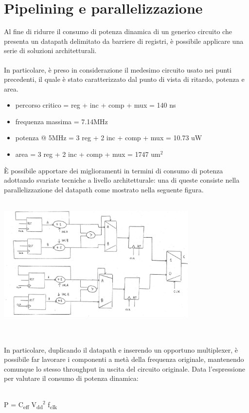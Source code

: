 \documentclass[11pt,  english, makeidx, a4paper, titlepage, oneside]{book}
\begin{document}
\section{Pipelining e parallelizzazione}
Al fine di ridurre il consumo di potenza dinamica di un generico circuito che presenta un datapath delimitato da barriere di registri, è possibile applicare una serie di soluzioni architetturali.
\\\\
In particolare, è preso in considerazione il medesimo circuito usato nei punti precedenti, il quale è stato caratterizzato dal punto di vista di ritardo, potenza e area.
\begin{itemize}
\item percorso critico = reg + inc + comp + mux = 140 ns
\item frequenza massima = 7.14MHz
\item potenza @ 5MHz = 3 reg + 2 inc + comp + mux = 10.73 uW
\item area = 3 reg + 2 inc + comp + mux = 1747 um$^2$
\end{itemize}
\vspace{0.3cm}
È possibile apportare dei miglioramenti in termini di consumo di potenza adottando svariate tecniche a livello architetturale: una di queste consiste nella parallelizzazione del datapath come mostrato nella seguente figura.
\\\\
\centerline{\includegraphics[width=10cm]{./img/Lab_3/datapath_parallelo.jpg}}
\\\\
In particolare, duplicando il datapath e inserendo un opportuno multiplexer, è possibile far lavorare i componenti a metà della frequenza originale, mantenendo comunque lo stesso throughput in uscita del circuito originale. Data l'espressione per valutare il consumo di potenza dinamica:
\\\\
\centerline{P = C\textsubscript{eff} V\textsubscript{dd}$^2$ f\textsubscript{clk}}
\end{document}
